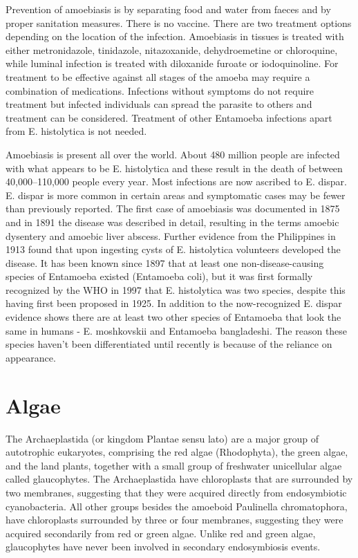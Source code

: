 Prevention of amoebiasis is by separating food and water from faeces and by proper sanitation measures. There is no vaccine. There are two treatment options depending on the location of the infection. Amoebiasis in tissues is treated with either metronidazole, tinidazole, nitazoxanide, dehydroemetine or chloroquine, while luminal infection is treated with diloxanide furoate or iodoquinoline. For treatment to be effective against all stages of the amoeba may require a combination of medications. Infections without symptoms do not require treatment but infected individuals can spread the parasite to others and treatment can be considered. Treatment of other Entamoeba infections apart from E. histolytica is not needed.

Amoebiasis is present all over the world. About 480 million people are infected with what appears to be E. histolytica and these result in the death of between 40,000--110,000 people every year. Most infections are now ascribed to E. dispar. E. dispar is more common in certain areas and symptomatic cases may be fewer than previously reported. The first case of amoebiasis was documented in 1875 and in 1891 the disease was described in detail, resulting in the terms amoebic dysentery and amoebic liver abscess. Further evidence from the Philippines in 1913 found that upon ingesting cysts of E. histolytica volunteers developed the disease. It has been known since 1897 that at least one non-disease-causing species of Entamoeba existed (Entamoeba coli), but it was first formally recognized by the WHO in 1997 that E. histolytica was two species, despite this having first been proposed in 1925. In addition to the now-recognized E. dispar evidence shows there are at least two other species of Entamoeba that look the same in humans - E. moshkovskii and Entamoeba bangladeshi. The reason these species haven't been differentiated until recently is because of the reliance on appearance.

\hypertarget{algae}{%
\section{Algae}\label{algae}}

The Archaeplastida (or kingdom Plantae sensu lato) are a major group of autotrophic eukaryotes, comprising the red algae (Rhodophyta), the green algae, and the land plants, together with a small group of freshwater unicellular algae called glaucophytes. The Archaeplastida have chloroplasts that are surrounded by two membranes, suggesting that they were acquired directly from endosymbiotic cyanobacteria. All other groups besides the amoeboid Paulinella chromatophora, have chloroplasts surrounded by three or four membranes, suggesting they were acquired secondarily from red or green algae. Unlike red and green algae, glaucophytes have never been involved in secondary endosymbiosis events.

